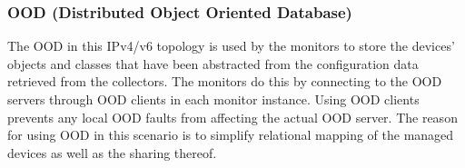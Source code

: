 \subsubsection{OOD (Distributed Object Oriented Database)}
The OOD in this IPv4/v6 topology is used by the monitors to store the devices’ objects and classes that have been abstracted from the configuration data retrieved from the collectors.
The monitors do this by connecting to the OOD servers through OOD clients in each monitor instance. Using OOD clients prevents any local OOD faults from affecting the actual OOD server.
The reason for using OOD in this scenario is to simplify relational mapping of the managed devices as well as the sharing thereof.

%